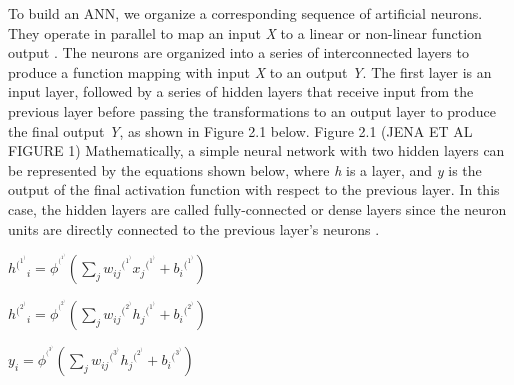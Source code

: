 \documentclass{article}
\begin{document}
To build an ANN, we organize a corresponding sequence of artificial neurons. They operate in parallel to map an input \emph{X} to a linear or non-linear function output \cite{https://doi.org/10.1002/cpe.6767,seger2018investigation}. The neurons are organized into a series of interconnected layers to produce a function mapping with input \emph{X} to an output \emph{Y}. The first layer is an input layer, followed by a series of hidden layers that receive input from the previous layer before passing the transformations to an output layer to produce the final output \emph{Y}, as shown in Figure 2.1 below. 
\newline
\newline
Figure 2.1 (JENA ET AL FIGURE 1) 
\newline
\newline
Mathematically, a simple neural network with two hidden layers can be represented by the equations shown below, where \emph{h} is a layer, and \emph{y} is the output of the final activation function with respect to the previous layer. In this case, the hidden layers are called fully-connected or dense layers since the neuron units are directly connected to the previous layer’s neurons \cite{grosse2019lecture03}.
\newline
\newline
\centerline{$h{^(^1^)}_{i} = \phi^{^(^1^)}(\sum_{j} w_{ij}{^(^1^)}x_j{^(^1^)} + b_i{^(^1^)})$}

\centerline{$h{^(^2^)}_{i} = \phi^{^(^2^)}(\sum_{j} w_{ij}{^(^2^)}h_j{^(^1^)} + b_i{^(^2^)})$}

\centerline{$y_{i} = \phi^{^(^3^)}(\sum_{j} w_{ij}{^(^3^)}h_j{^(^2^)} + b_i{^(^3^)})$ \cite{grosse2019lecture03}}
\end{document}
